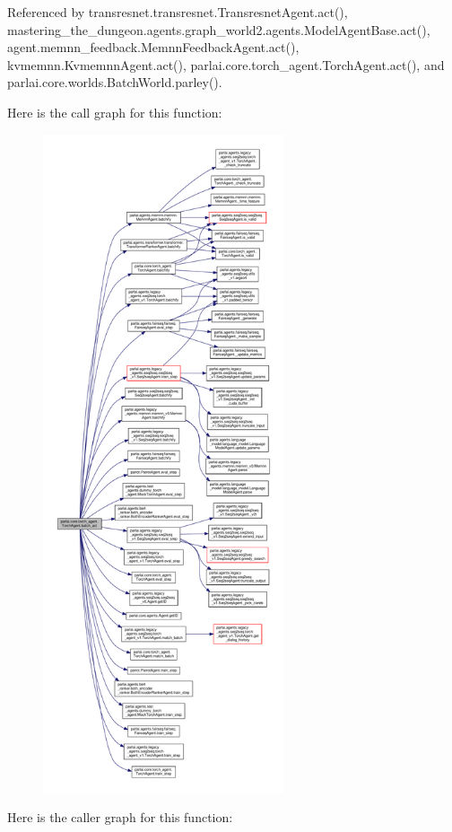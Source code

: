 Referenced by transresnet.\+transresnet.\+Transresnet\+Agent.\+act(), mastering\+\_\+the\+\_\+dungeon.\+agents.\+graph\+\_\+world2.\+agents.\+Model\+Agent\+Base.\+act(), agent.\+memnn\+\_\+feedback.\+Memnn\+Feedback\+Agent.\+act(), kvmemnn.\+Kvmemnn\+Agent.\+act(), parlai.\+core.\+torch\+\_\+agent.\+Torch\+Agent.\+act(), and parlai.\+core.\+worlds.\+Batch\+World.\+parley().

Here is the call graph for this function\+:
\nopagebreak
\begin{figure}[H]
\begin{center}
\leavevmode
\includegraphics[height=550pt]{classparlai_1_1core_1_1torch__agent_1_1TorchAgent_a7754a74d6c87590f46e71ec486c285a8_cgraph}
\end{center}
\end{figure}
Here is the caller graph for this function\+:
\nopagebreak
